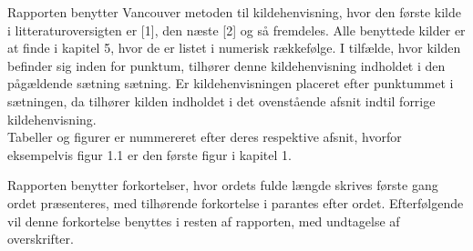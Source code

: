 Rapporten benytter Vancouver metoden til kildehenvisning, hvor den første kilde i litteraturoversigten er [1], den næste [2] og så fremdeles. Alle benyttede kilder er at finde i kapitel 5, hvor de er listet i numerisk rækkefølge. I tilfælde, hvor kilden befinder sig inden for punktum, tilhører denne kildehenvisning indholdet i den pågældende sætning sætning. Er kildehenvisningen placeret efter punktummet i sætningen, da tilhører kilden indholdet i det ovenstående afsnit indtil forrige kildehenvisning. \\
Tabeller og figurer er nummereret efter deres respektive afsnit, hvorfor eksempelvis figur 1.1 er den første figur i kapitel 1.

Rapporten benytter forkortelser, hvor ordets fulde længde skrives første gang ordet præsenteres, med tilhørende forkortelse i parantes efter ordet. Efterfølgende vil denne forkortelse benyttes i resten af rapporten, med undtagelse af overskrifter. 